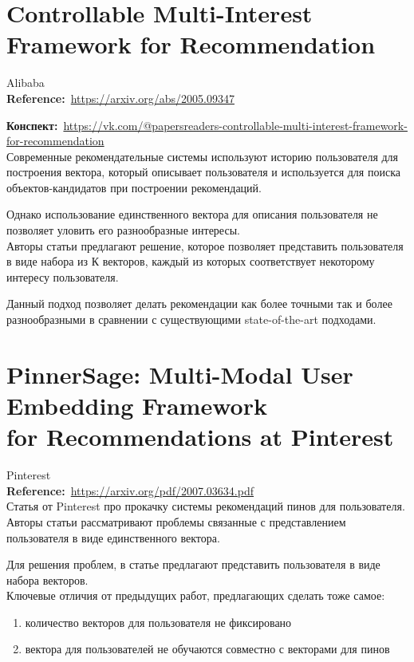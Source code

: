 \begin{bibunit}[plainnat]
\section*{Controllable Multi-Interest Framework for Recommendation}

Alibaba \\

\textbf{Reference:}~\url{https://arxiv.org/abs/2005.09347}

\textbf{Конспект:}~\url{https://vk.com/@papersreaders-controllable-multi-interest-framework-for-recommendation} \\

Современные рекомендательные системы используют историю пользователя для построения вектора, который описывает пользователя и используется для поиска объектов-кандидатов при построении рекомендаций. 

Однако использование единственного вектора для описания пользователя не позволяет уловить его разнообразные интересы. \\

Авторы статьи предлагают решение, которое позволяет представить пользователя в виде набора из К векторов, каждый из которых соответствует некоторому интересу пользователя.

Данный подход позволяет делать рекомендации как более точными так и более разнообразными в сравнении с существующими state-of-the-art подходами.

\section*{PinnerSage: Multi-Modal User Embedding Framework \\ for Recommendations at Pinterest}

Pinterest \\

\textbf{Reference:}~\url{https://arxiv.org/pdf/2007.03634.pdf} \\

Статья от Pinterest про прокачку системы рекомендаций пинов для пользователя. \\

Авторы статьи рассматривают проблемы связанные с представлением пользователя в виде единственного вектора.

Для решения проблем, в статье предлагают представить пользователя в виде набора векторов. \\

Ключевые отличия от предыдущих работ, предлагающих сделать тоже самое:
\begin{enumerate}
    \item количество векторов для пользователя не фиксировано
    \item вектора для пользователей не обучаются совместно с векторами для пинов
\end{enumerate}


\end{bibunit}
